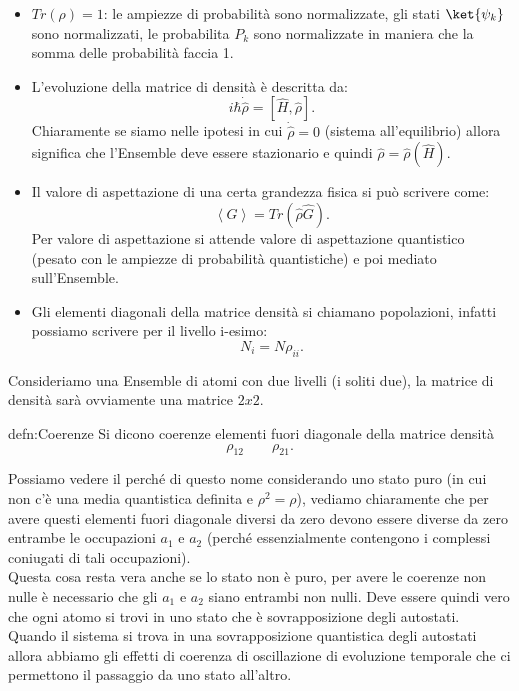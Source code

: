 \begin{itemize}
    \item $Tr(\rho) = 1$: le ampiezze di probabilità sono normalizzate, gli stati $\ket{\psi_k}$  sono normalizzati, le probabilita $P_k$ sono normalizzate in maniera che la somma delle probabilità faccia 1. 
    \item L'evoluzione della matrice di densità è descritta da:
	\[
	    i\hbar \dot{\hat{\rho}} = \left[\hat{H},\hat{\rho}\right]
	.\] 
	Chiaramente se siamo nelle ipotesi in cui $\dot{\hat{\rho}}=0$ (sistema all'equilibrio) allora significa che l'Ensemble deve essere stazionario e quindi $\hat{\rho}= \hat{\rho}(\hat{H})$.
    \item Il valore di aspettazione di una certa grandezza fisica si può scrivere come:
	\[
	    \left<G\right>= Tr(\hat{\rho}\hat{G}) 
	.\] 
	Per valore di aspettazione si attende valore di aspettazione quantistico (pesato con le ampiezze di probabilità quantistiche) e poi mediato sull'Ensemble.
    \item Gli elementi diagonali della matrice densità si chiamano popolazioni, infatti possiamo scrivere per il livello i-esimo:
	\[
		N_i = N\rho_{ii}
	.\] 
\end{itemize}
Consideriamo una Ensemble di atomi con due livelli (i soliti due), la matrice di densità sarà ovviamente una matrice $2x 2$. 
\begin{defn}[Coerenze]{defn:Coerenze}
Si dicono coerenze elementi fuori diagonale della matrice densità
\[
\rho_{12} \quad \quad \rho_{21}
.\]
\end{defn}
Possiamo vedere il perché di questo nome considerando uno stato puro (in cui non c'è una media quantistica definita e $\rho^2=\rho$), vediamo chiaramente che per avere questi elementi fuori diagonale diversi da zero devono essere diverse da zero entrambe le occupazioni $a_1$ e $a_2$ (perché essenzialmente contengono i complessi coniugati di tali occupazioni).\\
Questa cosa resta vera anche se lo stato non è puro, per avere le coerenze non nulle è necessario che gli $a_1$ e $a_2$ siano entrambi non nulli. Deve essere quindi vero che ogni atomo si trovi in uno stato che è sovrapposizione degli autostati. \\
Quando il sistema si trova in una sovrapposizione quantistica degli autostati allora abbiamo gli effetti di coerenza di oscillazione di evoluzione temporale che ci permettono il passaggio da uno stato all'altro. 
